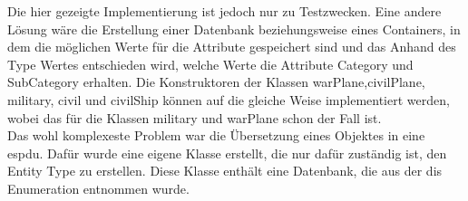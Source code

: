 Die hier gezeigte Implementierung ist jedoch nur zu Testzwecken. Eine andere Lösung wäre die Erstellung einer Datenbank beziehungsweise eines Containers, in dem die möglichen Werte für die Attribute gespeichert sind und das Anhand des  \glqq Type\grqq{}  Wertes entschieden wird, welche Werte die Attribute  \glqq Category\grqq{} und \glqq SubCategory\grqq{} erhalten. Die Konstruktoren der Klassen  \glqq warPlane\grqq{},\glqq civilPlane\grqq{}, \glqq military\grqq{}, \glqq civil\grqq{} und \glqq civilShip\grqq{} können auf die gleiche Weise implementiert werden, wobei das für die Klassen \glqq military\grqq{} und \glqq warPlane\grqq{} schon der Fall ist.\\
Das wohl komplexeste Problem war die Übersetzung eines Objektes in eine \ac{espdu}. Dafür wurde eine eigene Klasse erstellt, die nur dafür zuständig ist, den \glqq Entity Type\grqq{} zu erstellen. Diese Klasse enthält eine Datenbank, die aus der \ac{dis} Enumeration entnommen wurde. 

